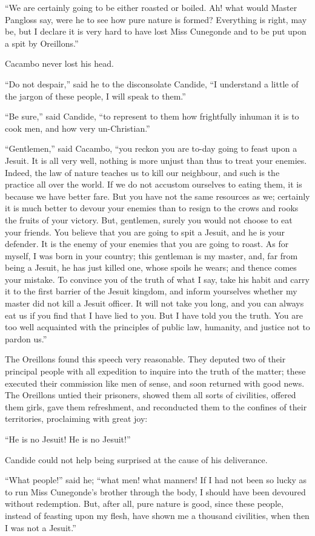 ``We are certainly going to be either roasted or boiled. Ah! what would Master Pangloss say, were he to see how pure nature is formed? Everything is right, may be, but I declare it is very hard to have lost Miss Cunegonde and to be put upon a spit by Oreillons.''

Cacambo never lost his head.

``Do not despair,'' said he to the disconsolate Candide, ``I understand a little of the jargon of these people, I will speak to them.''

``Be sure,'' said Candide, ``to represent to them how frightfully inhuman it is to cook men, and how very un-Christian.''

``Gentlemen,'' said Cacambo, ``you reckon you are to-day going to feast upon a Jesuit. It is all very well, nothing is more unjust than thus to treat your enemies. Indeed, the law of nature teaches us to kill our neighbour, and such is the practice all over the world. If we do not accustom ourselves to eating them, it is because we have better fare. But you have not the same resources as we; certainly it is much better to devour your enemies than to resign to the crows and rooks the fruits of your victory. But, gentlemen, surely you would not choose to eat your friends. You believe that you are going to spit a Jesuit, and he is your defender. It is the enemy of your enemies that you are going to roast. As for myself, I was born in your country; this gentleman is my master, and, far from being a Jesuit, he has just killed one, whose spoils he wears; and thence comes your mistake. To convince you of the truth of what I say, take his habit and carry it to the first barrier of the Jesuit kingdom, and inform yourselves whether my master did not kill a Jesuit officer. It will not take you long, and you can always eat us if you find that I have lied to you. But I have told you the truth. You are too well acquainted with the principles of public law, humanity, and justice not to pardon us.''

The Oreillons found this speech very reasonable. They deputed two of their principal people with all expedition to inquire into the truth of the matter; these executed their commission like men of sense, and soon returned with good news. The Oreillons untied their prisoners, showed them all sorts of civilities, offered them girls, gave them refreshment, and reconducted them to the confines of their territories, proclaiming with great joy:

``He is no Jesuit! He is no Jesuit!''

Candide could not help being surprised at the cause of his deliverance.

``What people!'' said he; ``what men! what manners! If I had not been so lucky as to run Miss Cunegonde's brother through the body, I should have been devoured without redemption. But, after all, pure nature is good, since these people, instead of feasting upon my flesh, have shown me a thousand civilities, when then I was not a Jesuit.''

